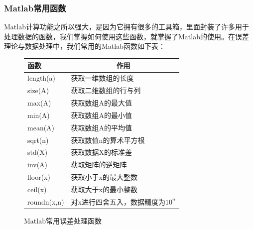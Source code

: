 \subsubsection{Matlab常用函数}
Matlab计算功能之所以强大，是因为它拥有很多的工具箱，里面封装了许多用于处理数据的函数，我们掌握如何使用这些函数，就掌握了Matlab的使用。在误差理论与数据处理中，我们常用的Matlab函数如下表：
\begin{figure}[H]
	\centering
	\begin{tabular}{p{3cm}<{\centering}p{8cm}}
		\toprule
		\textbf{函数}&\multicolumn{1}{c}{\textbf{作用}}	\\
		\midrule
		length(a)	&获取一维数组的长度\\
		size(A)	&获取二维数组的行与列\\
		max(A)	&获取数组A的最大值\\
		min(A)	&获取数组A的最小值\\
		mean(A)	&获取数组A的平均值\\
		sqrt(n)	&获取数值n的算术平方根\\
		std(X)	&获取数据X的标准差\\
		inv(A)	&获取矩阵的逆矩阵\\
		floor(x)	&获取小于x的最大整数\\
		ceil(x)	&获取大于x的最小整数\\
		roundn(x,n)	&对x进行四舍五入，数据精度为$ 10^n $\\
		\bottomrule
	\end{tabular}
	\captionsetup{type=table}
	\caption{Matlab常用误差处理函数}
\end{figure}
